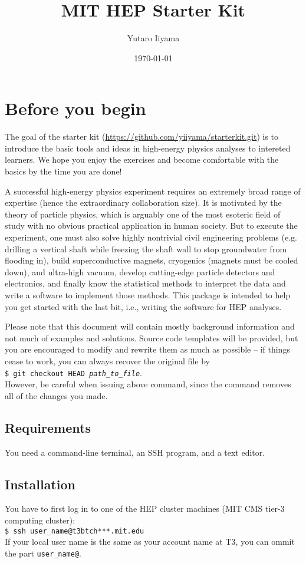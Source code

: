 \documentclass[12pt]{article}
\title{MIT HEP Starter Kit}
\author{Yutaro Iiyama}
\date{\today}
\newcommand{\terminal}[1]{\texttt{\$ #1}}
\begin{document}
\maketitle

\section*{Before you begin}
The goal of the starter kit (\url{https://github.com/yiiyama/starterkit.git}) is to introduce the basic tools and ideas in high-energy physics analyses to intereted learners. We hope you enjoy the exercises and become comfortable with the basics by the time you are done!

A successful high-energy physics experiment requires an extremely broad range of expertise (hence the extraordinary collaboration size). It is motivated by the theory of particle physics, which is arguably one of the most esoteric field of study with no obvious practical application in human society. But to execute the experiment, one must also solve highly nontrivial civil engineering problems (e.g. drilling a vertical shaft while freezing the shaft wall to stop groundwater from flooding in), build superconductive magnets, cryogenics (magnets must be cooled down), and ultra-high vacuum, develop cutting-edge particle detectors and electronics, and finally know the statistical methods to interpret the data and write a software to implement those methods. This package is intended to help you get started with the last bit, i.e., writing the software for HEP analyses.

Please note that this document will contain mostly background information and not much of examples and solutions. Source code templates will be provided, but you are encouraged to modify and rewrite them as much as possible -- if things cease to work, you can always recover the original file by \\
\terminal{git checkout HEAD \textit{path\_to\_file}}. \\
However, be careful when issuing above command, since the command removes all of the changes you made.

\subsection*{Requirements}
You need a command-line terminal, an SSH program, and a text editor.

\subsection*{Installation}
You have to first log in to one of the HEP cluster machines (MIT CMS tier-3 computing cluster): \\
\terminal{ssh user\_name@t3btch***.mit.edu} \\
If your local user name is the same as your account name at T3, you can ommit the part \texttt{user\_name@}.
\end{document}
